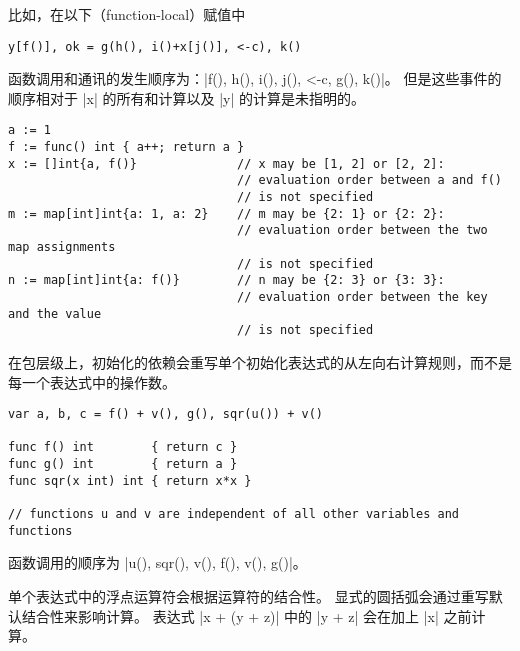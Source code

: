 比如，在以下（function-local）赋值中
\begin{lstlisting}[style=golang]
y[f()], ok = g(h(), i()+x[j()], <-c), k()
\end{lstlisting}
函数调用和通讯的发生顺序为：\code|f(), h(), i(), j(), <-c, g(), k()|。
但是这些事件的顺序相对于 \code|x| 的所有和计算以及 \code|y| 的计算是未指明的。
\begin{lstlisting}[style=golang]
a := 1
f := func() int { a++; return a }
x := []int{a, f()}				// x may be [1, 2] or [2, 2]:
								// evaluation order between a and f() 
								// is not specified
m := map[int]int{a: 1, a: 2}	// m may be {2: 1} or {2: 2}: 
								// evaluation order between the two map assignments 
								// is not specified
n := map[int]int{a: f()}		// n may be {2: 3} or {3: 3}: 
								// evaluation order between the key and the value 
								// is not specified
\end{lstlisting}

在包层级上，初始化的依赖会重写单个初始化表达式的从左向右计算规则，而不是每一个表达式中的操作数。
\begin{lstlisting}[style=golang]
var a, b, c = f() + v(), g(), sqr(u()) + v()

func f() int        { return c }
func g() int        { return a }
func sqr(x int) int { return x*x }

// functions u and v are independent of all other variables and functions
\end{lstlisting}
函数调用的顺序为 \code|u(), sqr(), v(), f(), v(), g()|。

单个表达式中的浮点运算符会根据运算符的结合性。
显式的圆括弧会通过重写默认结合性来影响计算。
表达式 \code|x + (y + z)| 中的 \code|y + z| 会在加上 \code|x| 之前计算。




















